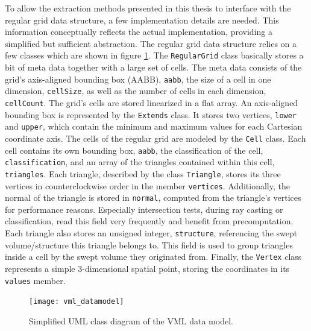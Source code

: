 To allow the extraction methods presented in this thesis to interface with the regular grid data structure, a few implementation details are needed.
This information conceptually reflects the actual implementation, providing a simplified but sufficient abstraction.
%
The regular grid data structure relies on a few classes which are shown in figure \ref{fig:vml_datamodel}.
The \lstinline!RegularGrid! class basically stores a bit of meta data together with a large set of cells.
The meta data consists of the grid's axis-aligned bounding box (AABB), \lstinline!aabb!, the size of a cell in one dimension, \lstinline!cellSize!, as well as the number of cells in each dimension, \lstinline!cellCount!.
The grid's cells are stored linearized in a flat array.
%
An axis-aligned bounding box is represented by the \lstinline!Extends! class.
It stores two vertices, \lstinline!lower! and \lstinline!upper!, which contain the minimum and maximum values for each Cartesian coordinate axis.
%
The cells of the regular grid are modeled by the \lstinline!Cell! class.
Each cell contains its own bounding box, \lstinline!aabb!, the classification of the cell, \lstinline!classification!, and an array of the triangles contained within this cell, \lstinline!triangles!.
%
Each triangle, described by the class \lstinline!Triangle!, stores its three vertices in counterclockwise order in the member \lstinline!vertices!.
Additionally, the normal of the triangle is stored in \lstinline!normal!, computed from the triangle's vertices for performance reasons.
Especially intersection tests, \eg during ray casting or classification, read this field very frequently and benefit from precomputation.
Each triangle also stores an unsigned integer, \lstinline!structure!, referencing the swept volume/structure this triangle belongs to.
This field is used to group triangles inside a cell by the swept volume they originated from.
%
Finally, the \lstinline!Vertex! class represents a simple 3-dimensional spatial point, storing the coordinates in its \lstinline!values! member.

\begin{figure}
	\centering
	\texttt{[image: vml\_datamodel]}
	\caption{
		Simplified UML class diagram of the VML data model.
	}
	\label{fig:vml_datamodel}
\end{figure}
